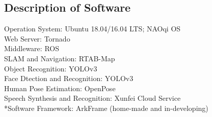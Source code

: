 \subsection*{Description of Software}
Operation System: Ubuntu 18.04/16.04 LTS; NAOqi OS \\
Web Server: Tornado \\
Middleware: ROS \\
SLAM and Navigation: RTAB-Map \\
Object Recognition: YOLOv3 \\
Face Dtection and Recognition: YOLOv3 \\
Human Pose Estimation:  OpenPose \\
Speech Synthesis and Recognition: Xunfei Cloud Service\\
*Software Framework: ArkFrame (home-made and in-developing)


